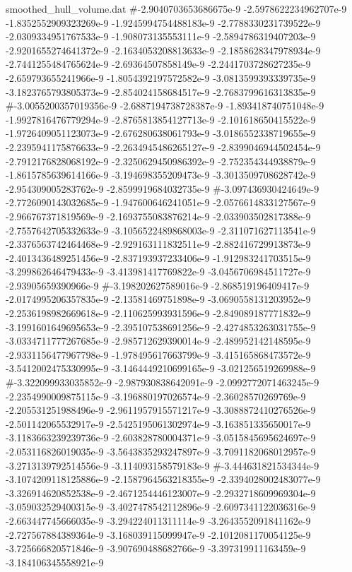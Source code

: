 \begin{filecontents}{smoothed_hull_volume.dat}
#-2.9040703653686675e-9	-2.5978622234962707e-9	-1.8352552909323269e-9	-1.9245994754488183e-9	-2.7788330231739522e-9	-2.0309334951767533e-9	-1.908073135553111e-9	-2.5894786319407203e-9	-2.9201655274641372e-9	-2.1634053208813633e-9	-2.1858628347978934e-9	-2.7441255484765624e-9	-2.69364507858149e-9	-2.2441703728627235e-9	-2.659793655241966e-9	-1.8054392197572582e-9	-3.0813599393339735e-9	-3.1823765793805373e-9	-2.854024158684517e-9	-2.7683799616313835e-9
#-3.0055200357019356e-9	-2.6887194738728387e-9	-1.893418740751048e-9	-1.9927816476779294e-9	-2.8765813854127713e-9	-2.101618650415522e-9	-1.9726409051123073e-9	-2.676280638061793e-9	-3.0186552338719655e-9	-2.2395941175876633e-9	-2.2634945486265127e-9	-2.8399046944502454e-9	-2.7912176828068192e-9	-2.3250629450986392e-9	-2.752354344938879e-9	-1.8615785639614166e-9	-3.194698355209473e-9	-3.3013509708628742e-9	-2.954309005283762e-9	-2.8599919684032735e-9
#-3.097436930424649e-9	-2.7726090143032685e-9	-1.947600646241051e-9	-2.0576614833127567e-9	-2.966767371819569e-9	-2.1693755083876214e-9	-2.033903502817388e-9	-2.7557642705332633e-9	-3.1056522489868003e-9	-2.311071627113541e-9	-2.3376563742464468e-9	-2.929163111832511e-9	-2.882416729913873e-9	-2.4013436489251456e-9	-2.837193937233406e-9	-1.912983241703515e-9	-3.299862646479433e-9	-3.413981417769822e-9	-3.0456706984511727e-9	-2.93905659390966e-9
#-3.198202627589016e-9	-2.868519196409417e-9	-2.0174995206357835e-9	-2.13581469751898e-9	-3.0690558131203952e-9	-2.2536198982669618e-9	-2.110625993931596e-9	-2.849089187771832e-9	-3.1991601649695653e-9	-2.395107538691256e-9	-2.4274853263031755e-9	-3.0334711777267685e-9	-2.985712629390014e-9	-2.489952142148595e-9	-2.9331156477967798e-9	-1.978495617663799e-9	-3.415165868473572e-9	-3.5412002475330995e-9	-3.1464449210699165e-9	-3.021256519269988e-9
#-3.322099933035852e-9	-2.987930838642091e-9	-2.0992772071463245e-9	-2.2354990009875115e-9	-3.196880197026574e-9	-2.36028570269769e-9	-2.205531251988496e-9	-2.9611957915571217e-9	-3.3088872410276526e-9	-2.501142065532917e-9	-2.5425195061302974e-9	-3.163851335650017e-9	-3.1183663239239736e-9	-2.603828780004371e-9	-3.0515845695624697e-9	-2.053116826019035e-9	-3.5643835293247897e-9	-3.7091182068012957e-9	-3.2713139792514556e-9	-3.114093158579183e-9
#-3.444631821534344e-9	-3.1074209118125886e-9	-2.1587964563218355e-9	-2.3394028002483077e-9	-3.326914620852538e-9	-2.4671254446123007e-9	-2.2932718609969304e-9	-3.059032529400315e-9	-3.4027478542112896e-9	-2.6097341122036316e-9	-2.663447745666035e-9	-3.294224011311114e-9	-3.2643552091841162e-9	-2.727567884389364e-9	-3.168039115099947e-9	-2.1012081170054125e-9	-3.725666820571846e-9	-3.907690488682766e-9	-3.397319911163459e-9	-3.184106345558921e-9

\end{filecontents}
